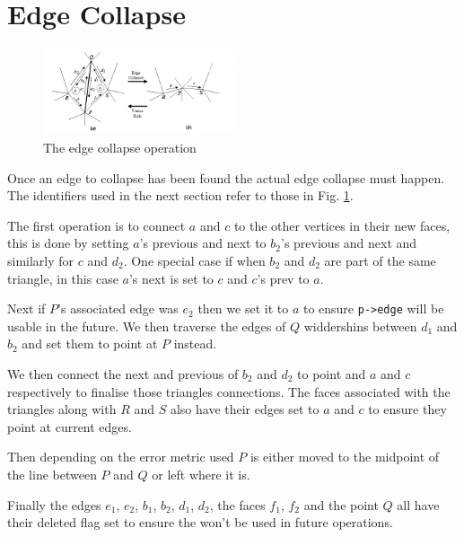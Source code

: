  \vspace{-10pt}
  \section{Edge Collapse}

    \begin{figure}
      \centering
      \includegraphics[width=0.5\textwidth]{images/edge_collapse}
      \caption{The edge collapse operation \label{edge_collapse}}
    \end{figure}

    Once an edge to collapse has been found the actual edge collapse must
    happen.  The identifiers used in the next section refer to those in Fig.
    \ref{edge_collapse}.

    The first operation is to connect $a$ and $c$ to the other vertices in their
    new faces, this is done by setting $a$'s previous and next to $b_2$'s
    previous and next and similarly for $c$ and $d_2$.  One special case if when
    $b_2$ and $d_2$ are part of the same triangle, in this case $a$'s next is
    set to $c$ and $c$'s prev to $a$.

    Next if $P$'s associated edge was $e_2$ then we set it to $a$ to ensure
    \texttt{p->edge} will be usable in the future.  We then traverse the edges
    of $Q$ widdershins between $d_1$ and $b_2$ and set them to point at $P$
    instead.

    We then connect the next and previous of $b_2$ and $d_2$ to point and $a$
    and $c$ respectively to finalise those triangles connections.  The faces
    associated with the triangles along with $R$ and $S$ also have their edges
    set to $a$ and $c$ to ensure they point at current edges.

    Then depending on the error metric used $P$ is either moved to the midpoint
    of the line between $P$ and $Q$ or left where it is.

    Finally the edges $e_1$, $e_2$, $b_1$, $b_2$, $d_1$, $d_2$, the faces $f_1$,
    $f_2$ and the point $Q$ all have their deleted flag set to ensure the won't
    be used in future operations.
